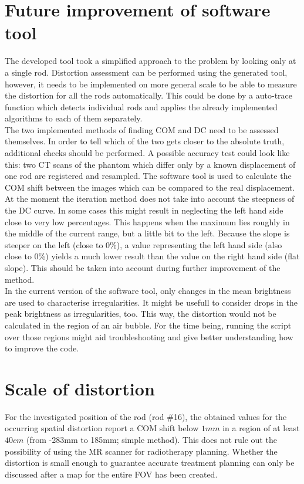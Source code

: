     
\section{Future improvement of software tool}

The developed tool took a simplified approach to the problem by looking only at a single rod.
Distortion assessment can be performed using the generated tool, however, it needs to be implemented on more general scale to be able to measure the distortion for all the rods automatically.
This could be done by a auto-trace function which detects individual rods and applies the already implemented algorithms to each of them separately.\\

The two implemented methods of finding COM and DC need to be assessed themselves.
In order to tell which of the two gets closer to the absolute truth, additional checks should be performed.
A possible accuracy test could look like this:
two CT scans of the phantom which differ only by a known displacement of one rod are registered and resampled.
The software tool is used to calculate the COM shift between the images which can be compared to the real displacement.\\

At the moment the iteration method does not take into account the steepness of the DC curve.
In some cases this might result in neglecting the left hand side close to very low percentages.
This happens when the maximum lies roughly in the middle of the current range, but a little bit to the left.
Because the slope is steeper on the left (close to 0\%), a value representing the left hand side (also close to 0\%) yields a much lower result than the value on the right hand side (flat slope).
This should be taken into account during further improvement of the method.\\

In the current version of the software tool, only changes in the mean brightness are used to characterise irregularities.
It might be usefull to consider drops in the peak brightness as irregularities, too.
This way, the distortion would not be calculated in the region of an air bubble.
For the time being, running the script over those regions might aid troubleshooting and give better understanding how to improve the code.\\


\section{Scale of distortion}

For the investigated position of the rod (rod \#16), the obtained values for the occurring spatial distortion report a COM shift below $1mm$ in a region of at least $40cm$ (from -283mm to 185mm; simple method).
This does not rule out the possibility of using the MR scanner for radiotherapy planning.
Whether the distortion is small enough to guarantee accurate treatment planning can only be discussed after a map for the entire FOV has been created.